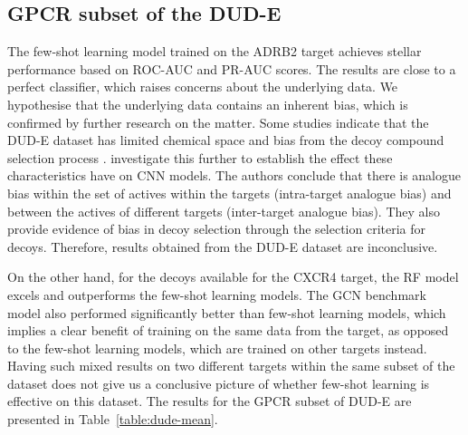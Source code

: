 \subsection{GPCR subset of the DUD-E}

The few-shot learning model trained on the ADRB2 target achieves stellar performance based on ROC-AUC and PR-AUC scores. The results are close to a perfect classifier, which raises concerns about the underlying data. We hypothesise that the underlying data contains an inherent bias, which is confirmed by further research on the matter. Some studies indicate that the DUD-E dataset has limited chemical space and bias from the decoy compound selection process \cite{smusz2013influence, wallach2018most}. \citet{chen2019hidden} investigate this further to establish the effect these characteristics have on CNN models. The authors conclude that there is analogue bias within the set of actives within the targets (intra-target analogue bias) and between the actives of different targets (inter-target analogue bias). They also provide evidence of bias in decoy selection through the selection criteria for decoys. Therefore, results obtained from the DUD-E dataset are inconclusive.

On the other hand, for the decoys available for the CXCR4 target, the RF model excels and outperforms the few-shot learning models. The GCN benchmark model also performed significantly better than few-shot learning models, which implies a clear benefit of training on the same data from the target, as opposed to the few-shot learning models, which are trained on other targets instead. Having such mixed results on two different targets within the same subset of the dataset does not give us a conclusive picture of whether few-shot learning is effective on this dataset. The results for the GPCR subset of DUD-E are presented in Table~\ref{table:dude-mean}.

